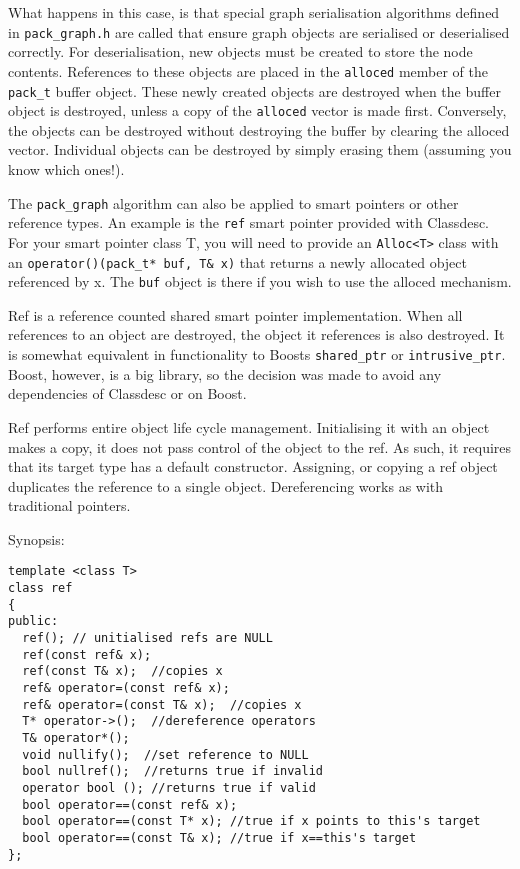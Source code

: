 What happens in this case, is that special graph serialisation
algorithms defined in \verb+pack_graph.h+ are called that ensure graph
objects are serialised or deserialised correctly. For deserialisation,
new objects must be created to store the node contents. References to
these objects are placed in the \verb+alloced+ member
of the \verb+pack_t+ buffer object. These newly created objects are
destroyed when the buffer object is destroyed, unless a copy of the
\verb+alloced+ vector is made first. Conversely, the objects can be
destroyed without destroying the buffer by clearing the alloced
vector. Individual objects can be destroyed by simply erasing them
(assuming you know which ones!).

The \verb+pack_graph+ algorithm can also be applied to smart pointers
or other reference types. An example is the \verb+ref+ smart pointer
provided with Classdesc. For your smart pointer class T, you will need to provide an \verb+Alloc<T>+
class with an \verb+operator()(pack_t* buf, T& x)+ that returns a
newly allocated object referenced by x. The \verb+buf+ object is there
if you wish to use the alloced mechanism.

\label{ref}

Ref is a reference counted shared smart pointer implementation. When
all references to an object are destroyed, the object it references is
also destroyed. It is somewhat equivalent in functionality to Boosts
\verb+shared_ptr+ or \verb+intrusive_ptr+. Boost, however, is a big
library, so the decision was made to avoid any dependencies of
Classdesc or \EcoLab{} on Boost.

Ref performs entire object life cycle management. Initialising it with
an object makes a copy, it does not pass control of the object to the
ref. As such, it requires that its target type has a default
constructor. Assigning, or copying a ref object duplicates the
reference to a single object. Dereferencing works as with traditional
pointers.

Synopsis:
\begin{verbatim}
template <class T>
class ref
{
public:
  ref(); // unitialised refs are NULL
  ref(const ref& x);
  ref(const T& x);  //copies x
  ref& operator=(const ref& x);
  ref& operator=(const T& x);  //copies x
  T* operator->();  //dereference operators
  T& operator*(); 
  void nullify();  //set reference to NULL
  bool nullref();  //returns true if invalid
  operator bool (); //returns true if valid
  bool operator==(const ref& x);
  bool operator==(const T* x); //true if x points to this's target
  bool operator==(const T& x); //true if x==this's target
};
\end{verbatim}

